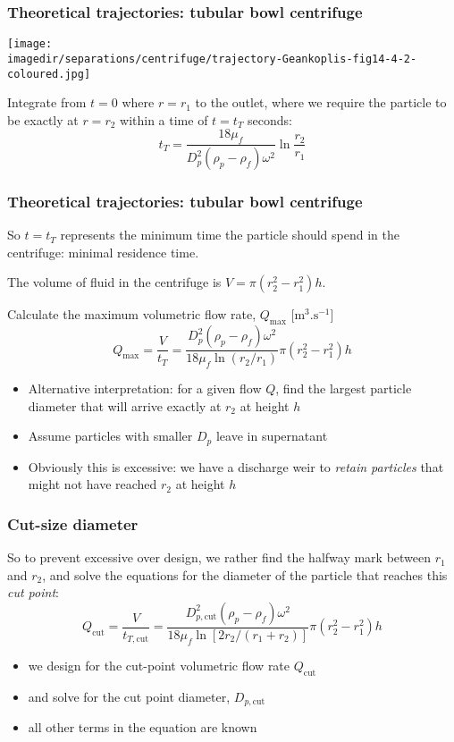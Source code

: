 \begin{frame}\frametitle{Theoretical trajectories: tubular bowl centrifuge}
	\begin{center}
		\texttt{[image: \\imagedir/separations/centrifuge/trajectory-Geankoplis-fig14-4-2-coloured.jpg]}
	\end{center}
	Integrate from $t=0$ where $r=r_1$ to the outlet, where we require the particle to be exactly at $r=r_2$ within a time of $t=t_T$ seconds:
	\[
		t_T = \frac{18 \mu_f}{D_p^2\left(\rho_p - \rho_f\right)\omega^2} \ln \frac{r_2}{r_1}
	\]
\end{frame}

\begin{frame}\frametitle{Theoretical trajectories: tubular bowl centrifuge}
	So $t=t_T$ represents the minimum time the particle should spend in the centrifuge: minimal residence time.
	
	\vspace{12pt}
	The volume of fluid in the centrifuge is $V = \pi \left(r_2^2 - r_1^2\right) h$. 
	
	\vspace{6pt}
	Calculate the maximum volumetric flow rate, $Q_\text{max}$ [$\text{m}^3.\text{s}^{-1}$]
	\[
		Q_\text{max} = \frac{V}{t_T} = \frac{D_p^2\left(\rho_p - \rho_f\right)\omega^2}{18 \mu_f \ln (r_2/r_1)} \pi \left(r_2^2 - r_1^2\right) h
	\]
	\begin{itemize}
		\item	Alternative interpretation: for a given flow $Q$, find the largest particle diameter that will arrive exactly at $r_2$ at height $h$
		\item	Assume particles with smaller $D_p$ leave in supernatant
		\item	Obviously this is excessive: we have a discharge weir to \emph{retain particles} that might not have reached $r_2$ at height $h$
	\end{itemize}	
\end{frame}

\begin{frame}\frametitle{Cut-size diameter}
	So to prevent excessive over design, we rather find the halfway mark between $r_1$ and $r_2$, and solve the equations for the diameter of the particle that reaches this \emph{cut point}:
	\[
		Q_\text{cut} = \frac{V}{t_{T,\text{cut}}} = \frac{D_{p,\text{cut}}^2\left(\rho_p - \rho_f\right)\omega^2}{18 \mu_f \ln \left[2r_2/(r_1+r_2)\right]} \pi \left(r_2^2 - r_1^2\right) h
	\]
	\begin{itemize}
		\item	we design for the cut-point volumetric flow rate $Q_\text{cut}$
		\item	and solve for the cut point diameter, $D_{p,\text{cut}}$
		\item	all other terms in the equation are known
	\end{itemize}
\end{frame}

